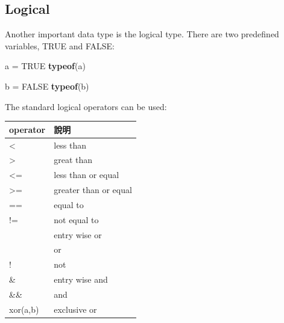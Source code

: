 \documentclass[]{book}
\newenvironment{Shaded}{\begin{snugshade}}{\end{snugshade}}
\newcommand{\KeywordTok}[1]{\textcolor[rgb]{0.13,0.29,0.53}{\textbf{#1}}}
\newcommand{\NormalTok}[1]{#1}
\newcommand{\OperatorTok}[1]{\textcolor[rgb]{0.81,0.36,0.00}{\textbf{#1}}}
\newcommand{\OtherTok}[1]{\textcolor[rgb]{0.56,0.35,0.01}{#1}}
\newcommand{\StringTok}[1]{\textcolor[rgb]{0.31,0.60,0.02}{#1}}
\theoremstyle{definition}
\theoremstyle{definition}
\theoremstyle{definition}
\theoremstyle{remark}
\begin{document}
\begin{Shaded}
\end{Shaded}

\begin{Shaded}
\end{Shaded}

\begin{Shaded}
\end{Shaded}

\hypertarget{logical}{%
\subsection{Logical}\label{logical}}

Another important data type is the logical type. There are two
predefined variables, TRUE and FALSE:

\begin{Shaded}
\begin{Highlighting}[]
\NormalTok{a =}\StringTok{ }\OtherTok{TRUE}
\KeywordTok{typeof}\NormalTok{(a)}
\end{Highlighting}
\end{Shaded}

\begin{Shaded}
\begin{Highlighting}[]
\NormalTok{b =}\StringTok{ }\OtherTok{FALSE}
\KeywordTok{typeof}\NormalTok{(b)}
\end{Highlighting}
\end{Shaded}

The standard logical operators can be used:

\begin{longtable}[]{@{}ll@{}}
\toprule
operator & 說明\tabularnewline
\midrule
\endhead
\textless{} & less than\tabularnewline
\textgreater{} & great than\tabularnewline
\textless{}= & less than or equal\tabularnewline
\textgreater{}= & greater than or equal\tabularnewline
== & equal to\tabularnewline
!= & not equal to\tabularnewline
\textbar{} & entry wise or\tabularnewline
\textbar{}\textbar{} & or\tabularnewline
! & not\tabularnewline
\& & entry wise and\tabularnewline
\&\& & and\tabularnewline
xor(a,b) & exclusive or\tabularnewline
\bottomrule
\end{longtable}
\end{document}
